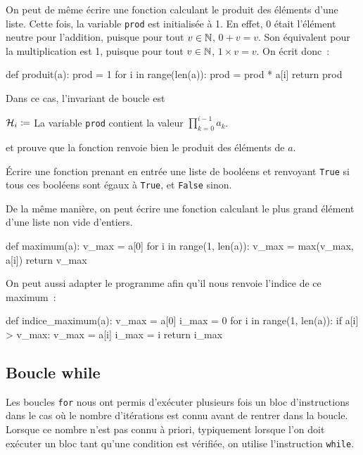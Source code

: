\documentclass{magnolia}
\begin{document}
On peut de même écrire une fonction calculant le produit des éléments d'une liste. Cette fois, la variable
\verb_prod_ est initialisée à 1. En effet, 0 était l'élément neutre pour l'addition, puisque pour tout
$v\in\mathbb{N}$, $0+v=v$. Son équivalent pour la multiplication est 1, puisque pour tout $v\in\mathbb{N}$, $1\times v=v$.
On écrit donc~:
\begin{pythoncodeline}
def produit(a):
    prod = 1
    for i in range(len(a)):
        prod = prod * a[i]
    return prod
\end{pythoncodeline}
Dans ce cas, l'invariant de boucle est
\begin{center}
$\mathcal{H}_i \coloneqq$ \og La variable \verb_prod_ contient la valeur
$\displaystyle\prod_{k=0}^{i-1} a_k$. \fg
\end{center}
et prouve que la fonction renvoie bien le produit des éléments de $a$.\\

\begin{exoUnique}
\exo Écrire une fonction prenant en entrée une liste de booléens et renvoyant \verb!True! si tous ces booléens
  sont égaux à \verb_True_, et \verb!False! sinon.
\end{exoUnique}
\vspace{2ex}
De la même manière, on peut écrire une fonction calculant le plus grand élément d'une liste non vide d'entiers.

\begin{pythoncodeline}
def maximum(a):
    v_max = a[0] 
    for i in range(1, len(a)):
        v_max = max(v_max, a[i])
    return v_max
\end{pythoncodeline}

\noindent
On peut aussi adapter le programme afin qu'il nous renvoie l'indice de ce maximum~:

\begin{pythoncodeline}
def indice_maximum(a):
    v_max = a[0]
    i_max = 0
    for i in range(1, len(a)):
        if a[i] > v_max:
            v_max = a[i]
            i_max = i
    return i_max
\end{pythoncodeline}

\subsection{Boucle while}

Les boucles \verb_for_ nous ont permis d'exécuter plusieurs fois un bloc d'instructions dans
le cas où le nombre d'itérations est connu avant de rentrer dans la boucle. Lorsque ce nombre n'est pas connu à priori, typiquement lorsque l'on doit exécuter un bloc tant qu'une condition est vérifiée, on utilise l'instruction \verb_while_.\\
\end{document}
